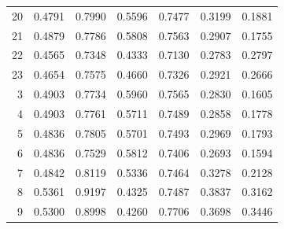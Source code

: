 \begin{tabular}{rrrrrrr}
    20 &        0.4791 &                0.7990 &         0.5596 &            0.7477 &                   0.3199 &                       0.1881 \\
    21 &        0.4879 &                0.7786 &         0.5808 &            0.7563 &                   0.2907 &                       0.1755 \\
    22 &        0.4565 &                0.7348 &         0.4333 &            0.7130 &                   0.2783 &                       0.2797 \\
    23 &        0.4654 &                0.7575 &         0.4660 &            0.7326 &                   0.2921 &                       0.2666 \\
     3 &        0.4903 &                0.7734 &         0.5960 &            0.7565 &                   0.2830 &                       0.1605 \\
     4 &        0.4903 &                0.7761 &         0.5711 &            0.7489 &                   0.2858 &                       0.1778 \\
     5 &        0.4836 &                0.7805 &         0.5701 &            0.7493 &                   0.2969 &                       0.1793 \\
     6 &        0.4836 &                0.7529 &         0.5812 &            0.7406 &                   0.2693 &                       0.1594 \\
     7 &        0.4842 &                0.8119 &         0.5336 &            0.7464 &                   0.3278 &                       0.2128 \\
     8 &        0.5361 &                0.9197 &         0.4325 &            0.7487 &                   0.3837 &                       0.3162 \\
     9 &        0.5300 &                0.8998 &         0.4260 &            0.7706 &                   0.3698 &                       0.3446 \\
\bottomrule
\end{tabular}
